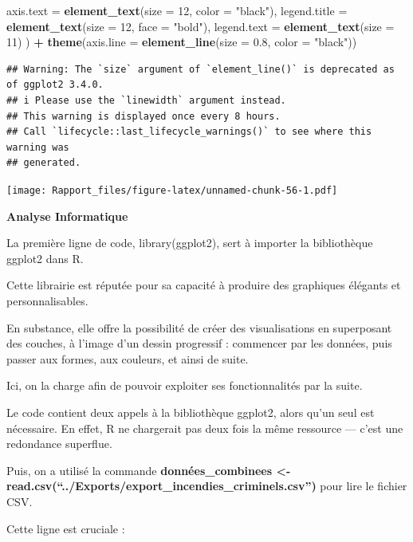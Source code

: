 \documentclass[
]{article}
\newenvironment{Shaded}{\begin{snugshade}}{\end{snugshade}}
\newcommand{\AttributeTok}[1]{\textcolor[rgb]{0.13,0.29,0.53}{#1}}
\newcommand{\DecValTok}[1]{\textcolor[rgb]{0.00,0.00,0.81}{#1}}
\newcommand{\FloatTok}[1]{\textcolor[rgb]{0.00,0.00,0.81}{#1}}
\newcommand{\FunctionTok}[1]{\textcolor[rgb]{0.13,0.29,0.53}{\textbf{#1}}}
\newcommand{\NormalTok}[1]{#1}
\newcommand{\SpecialCharTok}[1]{\textcolor[rgb]{0.81,0.36,0.00}{\textbf{#1}}}
\newcommand{\StringTok}[1]{\textcolor[rgb]{0.31,0.60,0.02}{#1}}
\begin{document}
\begin{Shaded}
\begin{Highlighting}[]
      \AttributeTok{axis.text =} \FunctionTok{element\_text}\NormalTok{(}\AttributeTok{size =} \DecValTok{12}\NormalTok{, }\AttributeTok{color =} \StringTok{"black"}\NormalTok{),  }
      \AttributeTok{legend.title =} \FunctionTok{element\_text}\NormalTok{(}\AttributeTok{size =} \DecValTok{12}\NormalTok{, }\AttributeTok{face =} \StringTok{"bold"}\NormalTok{), }
      \AttributeTok{legend.text =} \FunctionTok{element\_text}\NormalTok{(}\AttributeTok{size =} \DecValTok{11}\NormalTok{)  }
\NormalTok{    ) }\SpecialCharTok{+}
    \FunctionTok{theme}\NormalTok{(}\AttributeTok{axis.line =} \FunctionTok{element\_line}\NormalTok{(}\AttributeTok{size =} \FloatTok{0.8}\NormalTok{, }\AttributeTok{color =} \StringTok{"black"}\NormalTok{))  }
\end{Highlighting}
\end{Shaded}

\begin{verbatim}
## Warning: The `size` argument of `element_line()` is deprecated as of ggplot2 3.4.0.
## i Please use the `linewidth` argument instead.
## This warning is displayed once every 8 hours.
## Call `lifecycle::last_lifecycle_warnings()` to see where this warning was
## generated.
\end{verbatim}

\texttt{[image: Rapport\_files/figure-latex/unnamed-chunk-56-1.pdf]}

\textbf{Analyse Informatique}

La première ligne de code, library(ggplot2), sert à importer la
bibliothèque ggplot2 dans R.

Cette librairie est réputée pour sa capacité à produire des graphiques
élégants et personnalisables.

En substance, elle offre la possibilité de créer des visualisations en
superposant des couches, à l'image d'un dessin progressif : commencer
par les données, puis passer aux formes, aux couleurs, et ainsi de
suite.

Ici, on la charge afin de pouvoir exploiter ses fonctionnalités par la
suite.

Le code contient deux appels à la bibliothèque ggplot2, alors qu'un seul
est nécessaire. En effet, R ne chargerait pas deux fois la même
ressource --- c'est une redondance superflue.

Puis, on a utilisé la commande \textbf{données\_combinees \textless-
read.csv(``../Exports/export\_incendies\_criminels.csv'')} pour lire le
fichier CSV.

Cette ligne est cruciale :
\end{document}
